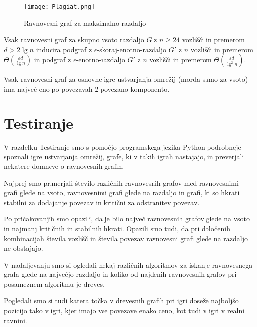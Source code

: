\documentclass[fin1, tisk]{fmfdelo}
\begin{document}
\begin{figure}[h]
    \centering
    \texttt{[image: Plagiat.png]}
    \caption{Ravnovesni graf za maksimalno razdaljo}
\end{figure}

\begin{izrek}
Vsak ravnovesni graf za skupno vsoto razdaljo \(G\) z \(n \geq 24\) vozlišči in premerom \(d > 2 \lg n\) inducira podgraf z \(\epsilon\)-skoraj-enotno-razdaljo \(G'\) z \(n\) vozlišči in premerom \(\Theta\left(\frac{\varepsilon d}{\lg n}\right)\) in podgraf z \(\epsilon\)-enotno-razdaljo \(G'\) z \(n\) vozlišči in premerom \(\Theta\left(\frac{\varepsilon d}{\lg^2 n}\right)\).
\end{izrek}

\begin{izrek}
Vsak ravnovesni graf za osnovne igre ustvarjanja omrežij (morda samo za vsoto) ima največ eno po povezavah 2-povezano komponento.
\end{izrek}

\section{Testiranje}

V razdelku Testiranje smo s pomočjo programskega jezika Python podrobneje spoznali igre ustvarjanja omrežij, grafe, ki v takih igrah nastajajo, in preverjali nekatere domneve o ravnovesnih grafih.

Najprej smo primerjali število različnih ravnovesnih grafov med ravnovesnimi grafi glede na vsoto, ravnovesnimi grafi glede na razdaljo in grafi, ki so hkrati stabilni za dodajanje povezav in kritični za odstranitev povezav.

Po pričakovanjih smo opazili, da je bilo največ ravnovesnih grafov glede na vsoto in najmanj kritičnih in stabilnih hkrati. Opazili smo tudi, da pri določenih kombinacijah števila vozlišč in števila povezav ravnovesni grafi glede na razdaljo ne obstajajo.

V nadaljevanju smo si ogledali nekaj različnih algoritmov za iskanje ravnovesnega grafa glede na največjo razdaljo in koliko od najdenih ravnovesnih grafov pri posameznem algoritmu je dreves.

Pogledali smo si tudi katera točka v drevesnih grafih pri igri doseže najboljšo pozicijo tako v igri, kjer imajo vse povezave enako ceno, kot tudi v igri v realni ravnini.
\end{document}
